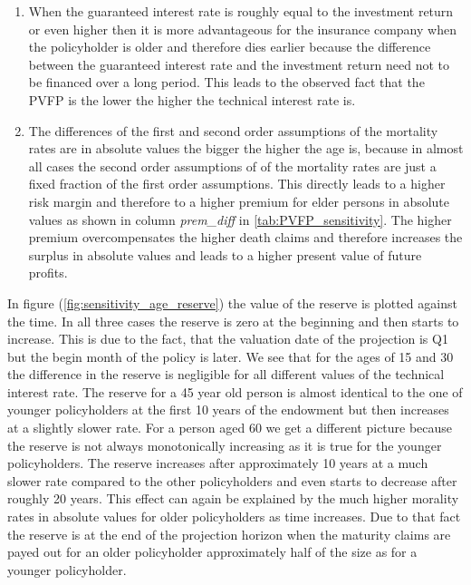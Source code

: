 \begin{enumerate}
	\item When the guaranteed interest rate is roughly equal to the investment return or even higher then it is more 		advantageous for the insurance company when the policyholder is older and therefore dies earlier because the difference between the guaranteed interest rate and the investment return need not to be financed over a long period. This leads to the observed fact that the PVFP is the lower the higher the technical interest rate is.
	\item The differences of the first and second order assumptions of the mortality rates are in absolute values the bigger the higher the age is, because in almost all cases the second order assumptions of of the mortality rates are just a fixed fraction of the first order assumptions. This directly leads to a higher risk margin and therefore to a higher premium for elder persons in absolute values as shown in column \textit{prem\_diff} in \ref{tab:PVFP_sensitivity}. The  higher premium overcompensates the higher death claims and therefore increases the surplus in absolute values and leads to a higher present value of future profits. 
\end{enumerate}
In figure (\ref{fig:sensitivity_age_reserve}) the value of the reserve is plotted against the time. In all three cases the reserve is zero at the beginning and then starts to increase. This is due to the fact, that the valuation date of the projection is Q1 but the begin month of the policy is later. We see that for the ages of 15 and 30 the difference in the reserve is negligible for all different values of the technical interest rate. The reserve for a 45 year old person is almost identical to the one of younger policyholders at the first 10 years of the endowment but then increases at a slightly slower rate. For a person aged 60 we get a different picture because the reserve is not always monotonically increasing as it is true for the younger policyholders. The reserve increases after approximately 10 years at a much slower rate compared to the other policyholders and even starts to decrease after roughly 20 years. This effect can again be explained by the much higher morality rates in absolute values for older policyholders as time increases. Due to that fact the reserve is at the end of the projection horizon when the maturity claims are payed out for an older policyholder approximately half of the size as for a younger policyholder.

